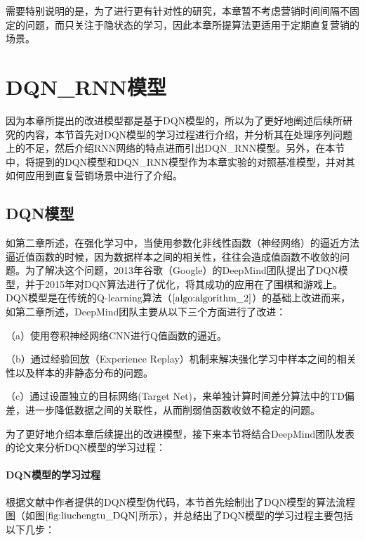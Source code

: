 需要特别说明的是，为了进行更有针对性的研究，本章暂不考虑营销时间间隔不固定的问题，而只关注于隐状态的学习，因此本章所提算法更适用于定期直复营销的场景。


\section{DQN_RNN模型}
因为本章所提出的改进模型都是基于DQN模型的，所以为了更好地阐述后续所研究的内容，本节首先对DQN模型的学习过程进行介绍，并分析其在处理序列问题上的不足，然后介绍RNN网络的特点进而引出DQN_RNN模型。另外，在本节中，将提到的DQN模型和DQN_RNN模型作为本章实验的对照基准模型，并对其如何应用到直复营销场景中进行了介绍。

\subsection{DQN模型}
如第二章所述，在强化学习中，当使用参数化非线性函数（神经网络）的逼近方法逼近值函数的时候，因为数据样本之间的相关性，往往会造成值函数不收敛的问题。为了解决这个问题，2013年谷歌（Google）的DeepMind团队提出了DQN模型，并于2015年对DQN算法进行了优化，将其成功的应用在了围棋和游戏上。DQN模型是在传统的Q-learning算法（$\ref{algo:algorithm_2}$）的基础上改进而来，如第二章所述，DeepMind团队主要从以下三个方面进行了改进：

（a）使用卷积神经网络CNN进行Q值函数的逼近。

（b）通过经验回放（Experience Replay）机制来解决强化学习中样本之间的相关性以及样本的非静态分布的问题。

（c）通过设置独立的目标网络(Target Net)，来单独计算时间差分算法中的TD偏差，进一步降低数据之间的关联性，从而削弱值函数收敛不稳定的问题。

 为了更好地介绍本章后续提出的改进模型，接下来本节将结合DeepMind团队发表的论文\citep{mnih2013playing,mnih2015human}来分析DQN模型的学习过程：

\paragraph{DQN模型的学习过程}
根据文献\citep{mnih2015human}中作者提供的DQN模型伪代码，本节首先绘制出了DQN模型的算法流程图（如图$\ref{fig:liuchengtu_DQN}$所示），并总结出了DQN模型的学习过程主要包括以下几步：

